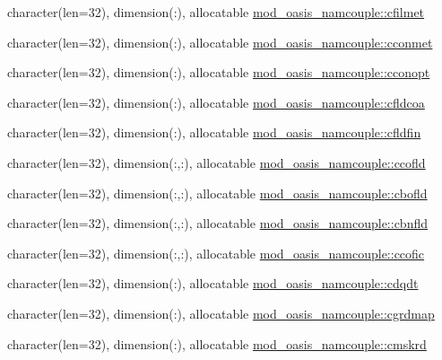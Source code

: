 \begin{DoxyCompactItemize}
\item 
character(len=32), dimension(\+:), allocatable \hyperlink{namespacemod__oasis__namcouple_ab97dbc120a10a399af30114b8112271d}{mod\+\_\+oasis\+\_\+namcouple\+::cfilmet}
\item 
character(len=32), dimension(\+:), allocatable \hyperlink{namespacemod__oasis__namcouple_ab7acfd03f0ce869ef05140629f9cefba}{mod\+\_\+oasis\+\_\+namcouple\+::cconmet}
\item 
character(len=32), dimension(\+:), allocatable \hyperlink{namespacemod__oasis__namcouple_a5081df8bbd2ac2fef59fea540a21085f}{mod\+\_\+oasis\+\_\+namcouple\+::cconopt}
\item 
character(len=32), dimension(\+:), allocatable \hyperlink{namespacemod__oasis__namcouple_ade62d9a196cb7afbfd082442bfb80707}{mod\+\_\+oasis\+\_\+namcouple\+::cfldcoa}
\item 
character(len=32), dimension(\+:), allocatable \hyperlink{namespacemod__oasis__namcouple_a4621ff35a33e57ca753e899cae7c9fff}{mod\+\_\+oasis\+\_\+namcouple\+::cfldfin}
\item 
character(len=32), dimension(\+:,\+:), allocatable \hyperlink{namespacemod__oasis__namcouple_ae25142b256fc084c542bd1c8ae776a85}{mod\+\_\+oasis\+\_\+namcouple\+::ccofld}
\item 
character(len=32), dimension(\+:,\+:), allocatable \hyperlink{namespacemod__oasis__namcouple_a600d1a6024b9e5895ae4d53bbf465269}{mod\+\_\+oasis\+\_\+namcouple\+::cbofld}
\item 
character(len=32), dimension(\+:,\+:), allocatable \hyperlink{namespacemod__oasis__namcouple_ab202dc43ea09f2b21fb0152c971a3e65}{mod\+\_\+oasis\+\_\+namcouple\+::cbnfld}
\item 
character(len=32), dimension(\+:,\+:), allocatable \hyperlink{namespacemod__oasis__namcouple_aa1ced7ffb831c65667b2d7b82e5b6187}{mod\+\_\+oasis\+\_\+namcouple\+::ccofic}
\item 
character(len=32), dimension(\+:), allocatable \hyperlink{namespacemod__oasis__namcouple_ae5b2227e6add5cbb7281030353c13a48}{mod\+\_\+oasis\+\_\+namcouple\+::cdqdt}
\item 
character(len=32), dimension(\+:), allocatable \hyperlink{namespacemod__oasis__namcouple_a6a86cf4b0f404b86ea40fee517ae41d2}{mod\+\_\+oasis\+\_\+namcouple\+::cgrdmap}
\item 
character(len=32), dimension(\+:), allocatable \hyperlink{namespacemod__oasis__namcouple_a8872c4a8cdff16451ef7d8af02e39358}{mod\+\_\+oasis\+\_\+namcouple\+::cmskrd}
\item 

\end{DoxyCompactItemize}

